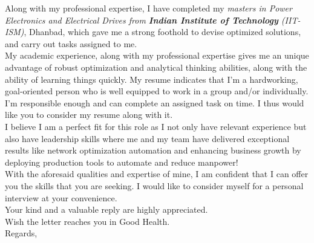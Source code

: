 \documentclass[10pt, a4paper]{article}
\begin{document}
	Along with my professional expertise, I have completed my \textit{masters in Power Electronics and Electrical Drives from \textbf{Indian Institute of Technology} (IIT-ISM)}, Dhanbad, which gave me a strong foothold to devise optimized solutions, and carry out tasks assigned to me. \\[3pt]


    My academic experience, along with my professional expertise gives me an unique advantage of robust optimization and analytical thinking abilities, along with the ability of learning things quickly. My resume indicates that I’m a hardworking, goal-oriented person who is well equipped to work in a group and/or individually. I’m responsible enough and can complete an assigned task on time. I thus would like you to consider my resume along with it. \\[3pt]

	I believe I am a perfect fit for this role as I not only have relevant experience but also have leadership skills where me and my team have delivered exceptional results like network optimization automation and enhancing business growth by deploying production tools to automate and reduce manpower! \\[3pt]

	With the aforesaid qualities and expertise of mine, I am confident that I can offer you the skills that you are seeking. I would like to consider myself for a personal interview at your convenience. \\[3pt]

	Your kind and a valuable reply are highly appreciated. \\[3pt]

	Wish the letter reaches you in Good Health. \\[5pt]

	Regards, \\ \AuthorFullName

\end{document}
